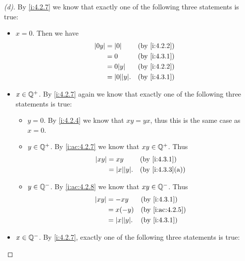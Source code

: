 \begin{proof}[(d)]
  By \cref{i:4.2.7} we know that exactly one of the following three statements is true:
  \begin{itemize}
    \item \(x = 0\).
          Then we have
          \begin{align*}
            \abs{0y} & = \abs{0}          &  & \by{i:4.2.2} \\
                     & = 0                &  & \by{i:4.3.1} \\
                     & = 0 \abs{y}        &  & \by{i:4.2.2} \\
                     & = \abs{0} \abs{y}. &  & \by{i:4.3.1}
          \end{align*}
    \item \(x \in \mathbb{Q}^+\).
          By \cref{i:4.2.7} again we know that exactly one of the following three statements is true:
          \begin{itemize}
            \item \(y = 0\).
                  By \cref{i:4.2.4} we know that \(xy = yx\), thus this is the same case as \(x = 0\).
            \item \(y \in \mathbb{Q}^+\).
                  By \cref{i:ac:4.2.7} we know that \(xy \in \mathbb{Q}^+\).
                  Thus
                  \begin{align*}
                    \abs{xy} & = xy               &  & \by{i:4.3.1}    \\
                             & = \abs{x} \abs{y}. &  & \by{i:4.3.3}[a]
                  \end{align*}
            \item \(y \in \mathbb{Q}^-\).
                  By \cref{i:ac:4.2.8} we know that \(xy \in \mathbb{Q}^-\).
                  Thus
                  \begin{align*}
                    \abs{xy} & = -xy              &  & \by{i:4.3.1}    \\
                             & = x(-y)            &  & \by{i:ac:4.2.5} \\
                             & = \abs{x} \abs{y}. &  & \by{i:4.3.1}    \\
                  \end{align*}
          \end{itemize}
    \item \(x \in \mathbb{Q}^-\).
          By \cref{i:4.2.7}, exactly one of the following three statements is true:
          \begin{itemize}

\end{itemize}
\end{itemize}
\end{proof}
